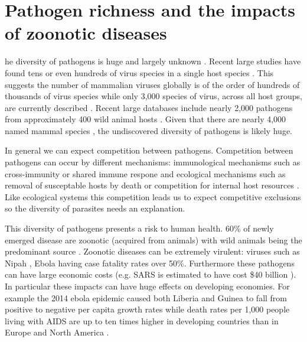 
\section{Pathogen richness and the impacts of zoonotic diseases}



he diversity of pathogens is huge and largely unknown \cite{poulin2014parasite}.
Recent large studies have found tens \cite{anthony2013strategy} or even hundreds of virus species in a single host species \cite{anthony2015non}.
This suggests the number of mammalian viruses globally is of the order of hundreds of thousands of virus species \cite{anthony2013strategy} while only 3,000 species of virus, across all host groups, are currently described \cite{ICTV}.
Recent large databases include nearly 2,000 pathogens from approximately 400 wild animal hosts \cite{wardeh2015database}.
Given that there are nearly 4,000 named mammal species \cite{wilson2005mammal}, the undiscovered diversity of pathogens is likely huge.

In general we can expect competition between pathogens.
Competition between pathogens can occur by different mechanisms: immunological mechanisms such as cross-immunity or shared immune respone \cite{fenton2010applying} and ecological mechanisms such as removal of susceptable hosts by death \cite{rohani2003ecological} or competition for internal host resources \cite{griffiths2014analysis}.
Like ecological systems this competition leads us to expect competitive exclusions \cite{bremermann1989competitive, martcheva2013competitive, ackleh2003competitive, ackleh2014robust, turner2002impact} so the diversity of parasites needs an explanation.


This diversity of pathogens presents a risk to human health.
60\% of newly emerged disease are zoonotic (acquired from animals) with wild animals being the predominant source \cite{jones2008global, woolhouse2006host, taylor2001risk}.
Zoonotic diseases can be extremely virulent: viruses such as Nipah \cite{luby2009recurrent}, Ebola \cite{lefebvre2014case} having case fatality rates over 50\%.
Furthermore these pathogens can have large economic costs (e.g. SARS is estimated to have cost \$40 billion \cite{knobler2004learning}).
In particular these impacts can have huge effects on developing economies.
For example the 2014 ebola epidemic caused both Liberia and Guinea to fall from positive to negative per capita growth rates \cite{ebolaWorldbank, ebola2015worldbank} while death rates per 1,000 people living with AIDS are up to ten times higher in developing countries than in Europe and North America \cite{granich2015trends}.



